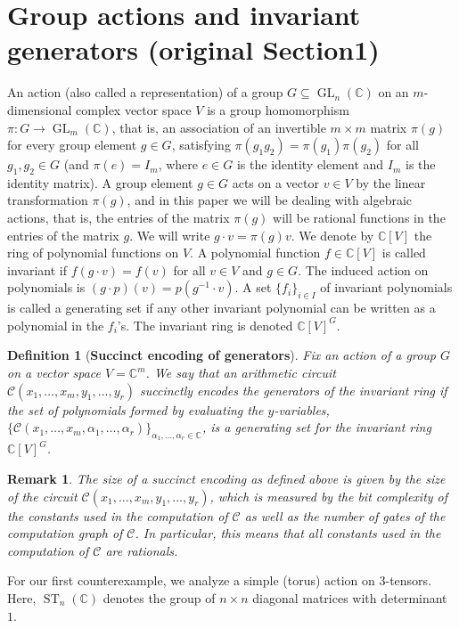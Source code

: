 \documentclass[10pt,a4paper]{article}
\newtheorem{definition}[theorem]{Definition}
\newtheorem{remark}[theorem]{Remark}
\newcommand{\C}{\mathbb C}
\newcommand{\ST}{\operatorname{ST}}
\newcommand{\GL}{\operatorname{GL}}
\newcommand{\cC}{\mathcal C}
\begin{document}
\section*{Group actions and invariant generators (original Section1)}
An action (also called a representation) of a group $G\subseteq\GL_n(\C)$ on an $m$-dimensional complex vector space $V$ is a group homomorphism $\pi:G\to\GL_m(\C)$, that is, an association of an invertible $m\times m$ matrix $\pi(g)$ for every group element $g\in G$, satisfying $\pi(g_1g_2)=\pi(g_1)\pi(g_2)$ for all $g_1,g_2\in G$ (and $\pi(e)=I_m$, where $e\in G$ is the identity element and $I_m$ is the identity matrix). A group element $g\in G$ acts on a vector $v\in V$ by the linear transformation $\pi(g)$, and in this paper we will be dealing with algebraic actions, that is, the entries of the matrix $\pi(g)$ will be rational functions in the entries of the matrix $g$. We will write $g\cdot v=\pi(g)v$. We denote by $\C[V]$ the ring of polynomial functions on $V$.
A polynomial function $f\in\C[V]$ is called invariant if $f(g\cdot v)=f(v)$ for all $v\in V$ and $g\in G$. The induced action on polynomials is $(g\cdot p)(v)=p(g^{-1}\cdot v)$. A set $\{f_i\}_{i\in I}$ of invariant polynomials is called a generating set if any other invariant polynomial can be written as a polynomial in the $f_i$'s. The invariant ring is denoted $\C[V]^G$.
\setcounter{theorem}{2}
\begin{definition}[\textbf{Succinct encoding of generators}] \label{def:succ.enc}
	Fix an action of a group $G$ on a vector space $V = \C^m$. We say that an arithmetic circuit
	$\cC(x_1,\ldots, x_m,y_1,\ldots, y_r)$ \emph{succinctly encodes} the generators of the invariant
	ring if the set of polynomials formed by evaluating the $y$-variables,
	$\{\cC(x_1,\ldots, x_m, \alpha_1,\ldots, \alpha_r)\}_{\alpha_1,\ldots, \alpha_r \in \C}$,
  is a generating set for the invariant ring~$\C[V]^G$.
\end{definition}

\begin{remark}
	The \emph{size} of a succinct encoding as defined above is given by the size of the circuit
	$\cC(x_1, \ldots, x_m, y_1, \ldots, y_r)$, which is measured by the bit complexity of the
	constants used in the computation of $\cC$ as well as the number of gates of the computation
	graph of $\cC$.
  In particular, this means that all constants used in the computation of $\cC$ are rationals.
\end{remark}

\setcounter{theorem}{7}
For our first counterexample, we analyze a simple (torus) action on $3$-tensors.
Here, $\ST_n(\C)$ denotes the group of $n\times n$ diagonal matrices with determinant $1$.
\end{document}
